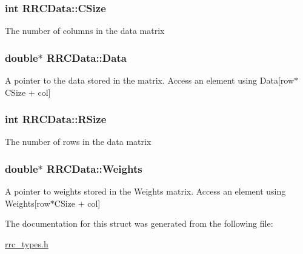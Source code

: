 \subsubsection[{C\+Size}]{\setlength{\rightskip}{0pt plus 5cm}int R\+R\+C\+Data\+::\+C\+Size}\label{struct_r_r_c_data_a573616e93e0241d11b40ea56c708041b}
The number of columns in the data matrix \hypertarget{struct_r_r_c_data_a4f2db98f036a01dca7168fee658bac0c}{}
\subsubsection[{Data}]{\setlength{\rightskip}{0pt plus 5cm}double$\ast$ R\+R\+C\+Data\+::\+Data}\label{struct_r_r_c_data_a4f2db98f036a01dca7168fee658bac0c}
A pointer to the data stored in the matrix. Access an element using Data\mbox{[}row$\ast$\+C\+Size + col\mbox{]} \hypertarget{struct_r_r_c_data_aaebd12e68638f3572eea166c7dd0af69}{}
\subsubsection[{R\+Size}]{\setlength{\rightskip}{0pt plus 5cm}int R\+R\+C\+Data\+::\+R\+Size}\label{struct_r_r_c_data_aaebd12e68638f3572eea166c7dd0af69}
The number of rows in the data matrix \hypertarget{struct_r_r_c_data_a2579ee2008f91694842f2278630852bf}{}
\subsubsection[{Weights}]{\setlength{\rightskip}{0pt plus 5cm}double$\ast$ R\+R\+C\+Data\+::\+Weights}\label{struct_r_r_c_data_a2579ee2008f91694842f2278630852bf}
A pointer to weights stored in the Weights matrix. Access an element using Weights\mbox{[}row$\ast$\+C\+Size + col\mbox{]} 

The documentation for this struct was generated from the following file\+:\begin{DoxyCompactItemize}
\item 
\hyperlink{rrc__types_8h}{rrc\+\_\+types.\+h}\end{DoxyCompactItemize}
